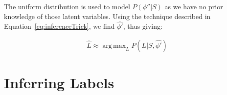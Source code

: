 \documentclass[12pt,a4paper,twoside,openright]{report} \usepackage[pdfborder={0 0 0}]{hyperref}    %
\DeclareMathOperator*{\argmax}{arg\,max} \DeclareMathOperator*{\argmin}{arg\,min}
\theoremstyle{definition} \newtheorem{definition}{Definition}[section]
\begin{document}
The uniform distribution is used to model $P(\phi''|S)$ as we have no prior knowledge of those latent variables. Using
the technique described in Equation~\ref{eq:inferenceTrick}, we find $\hat{\phi'}$, thus giving: 

\begin{equation} \begin{aligned} \hat L \approx \argmax_L P(L | S, \hat{\phi'}) \end{aligned}
\label{eq:aceProbSolLatent} \end{equation}









\section{Inferring Labels}
\end{document}
